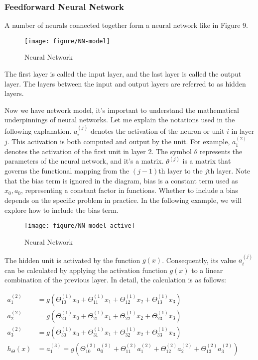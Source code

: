\documentclass{article}
\begin{document}
    \newpage
	\subsubsection{Feedforward Neural Network}

    A number of neurals connected together form a neural network like in Figure 9.

    \begin{figure}[htbp]
        \centering
        \texttt{[image: figure/NN-model]}
        \caption{Neural Network}
        \end{figure}



    The first layer is called the input layer, and the last layer is called the output layer. The layers between the input and output layers are referred to as hidden layers.

    Now we have network model, it's important to understand the mathematical underpinnings of neural networks. Let me explain the notations used in the following explanation. $a^{(j)}_{i}$ denotes the activation of the neuron or unit $i$ in layer $j$. This activation is both computed and output by the unit. For example, $a^{(2)}_1$ denotes the activation of the first unit in layer 2. The symbol $\theta$ represents the parameters of the neural network, and it's a matrix. $\theta^{(j)}$ is a matrix that governs the functional mapping from the $(j-1)$th layer to the $j$th layer. Note that the bias term is ignored in the diagram, bias is a constant term used as $x_0, a_0$, representing a constant factor in functions. Whether to include a bias depends on the specific problem in practice. In the following example, we will explore how to include the bias term.


    \begin{figure}[htbp]
        \centering
        \texttt{[image: figure/NN-model-active]}
        \caption{Neural Network}
        \end{figure}

    The hidden unit is activated by the function $g(x)$. Consequently, its value $a^{(j)}_{i}$ can be calculated by applying the activation function $g(x)$ to a linear combination of the previous layer. In detail, the calculation is as follows:

    $\begin{aligned} a_1^{(2)} & =g\left(\Theta_{10}^{(1)} x_0+\Theta_{11}^{(1)} x_1+\Theta_{12}^{(1)} x_2+\Theta_{13}^{(1)} x_3\right) \\ a_2^{(2)} & =g\left(\Theta_{20}^{(1)} x_0+\Theta_{21}^{(1)} x_1+\Theta_{22}^{(1)} x_2+\Theta_{23}^{(1)} x_3\right) \\ a_3^{(2)} & =g\left(\Theta_{30}^{(1)} x_0+\Theta_{31}^{(1)} x_1+\Theta_{32}^{(1)} x_2+\Theta_{33}^{(1)} x_3\right) \\ h_{\Theta}(x) & =a_1^{(3)}=g\left(\Theta_{10}^{(2)} a_0^{(2)}+\Theta_{11}^{(2)} a_1^{(2)}+\Theta_{12}^{(2)} a_2^{(2)}+\Theta_{13}^{(2)} a_3^{(2)}\right)\end{aligned}$ \\
\end{document}
